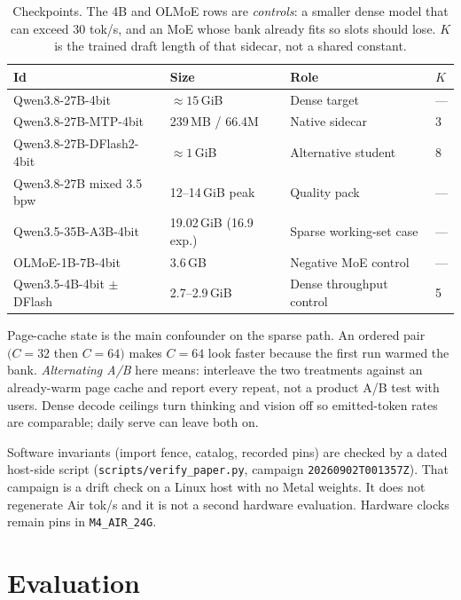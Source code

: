 \begin{table}[t]
\centering
\caption{Checkpoints. The 4B and OLMoE rows are \emph{controls}: a smaller dense model that can exceed 30 tok/s, and an MoE whose bank already fits so slots should lose. $K$ is the trained draft length of that sidecar, not a shared constant.}
\label{tab:ckpt}
\small
\begin{tabular}{@{}llll@{}}
\toprule
Id & Size & Role & $K$ \\
\midrule
Qwen3.8-27B-4bit & ${\approx}15$\,GiB & Dense target & --- \\
Qwen3.8-27B-MTP-4bit & 239\,MB / 66.4M & Native sidecar & 3 \\
Qwen3.8-27B-DFlash2-4bit & ${\approx}1$\,GiB & Alternative student & 8 \\
Qwen3.8-27B mixed 3.5\,bpw & 12--14\,GiB peak & Quality pack & --- \\
Qwen3.5-35B-A3B-4bit & 19.02\,GiB (16.9 exp.) & Sparse working-set case & --- \\
OLMoE-1B-7B-4bit & 3.6\,GB & Negative MoE control & --- \\
Qwen3.5-4B-4bit $\pm$ DFlash & 2.7--2.9\,GiB & Dense throughput control & 5 \\
\bottomrule
\end{tabular}
\end{table}

Page-cache state is the main confounder on the sparse path. An ordered pair $(C{=}32$ then $C{=}64)$ makes $C{=}64$ look faster because the first run warmed the bank. \emph{Alternating A/B} here means: interleave the two treatments against an already-warm page cache and report every repeat, not a product A/B test with users. Dense decode ceilings turn thinking and vision off so emitted-token rates are comparable; daily serve can leave both on.

Software invariants (import fence, catalog, recorded pins) are checked by a dated host-side script (\texttt{scripts/verify\_paper.py}, campaign \texttt{20260902T001357Z}). That campaign is a drift check on a Linux host with no Metal weights. It does not regenerate Air tok/s and it is not a second hardware evaluation. Hardware clocks remain pins in \texttt{M4\_AIR\_24G}.

\section{Evaluation}
\label{sec:eval}

